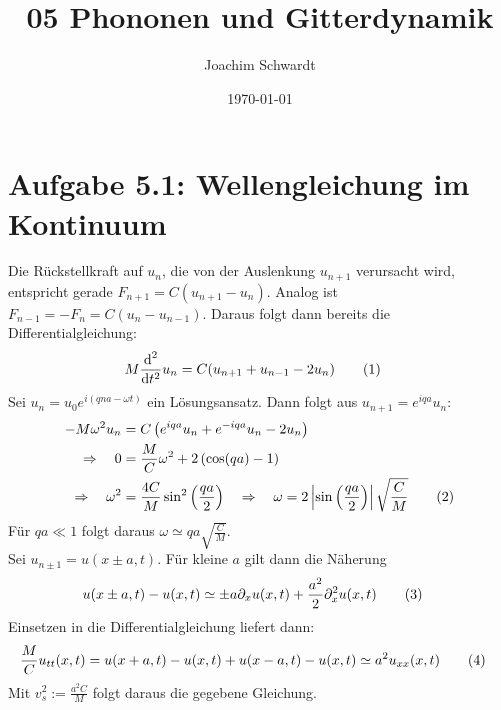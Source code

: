 \documentclass[a4paper,12pt]{article}
\newcommand\numberthis{\addtocounter{equation}{1}\tag{\theequation}}
\newcommand{\kla}{}
\newcommand{\tecxt}{}
\begin{document}
\title{05 Phononen und Gitterdynamik}
\author{Joachim Schwardt}
\date{\today}
\maketitle

\section*{Aufgabe 5.1: Wellengleichung im Kontinuum}
Die Rückstellkraft auf $u_n$, die von der Auslenkung $u_{n+1}$ verursacht wird, entspricht gerade $F_{n+1}=C(u_{n+1}-u_n)$. Analog ist $F_{n-1}=-F_n=C(u_n-u_{n-1})$. Daraus folgt dann bereits die Differentialgleichung:
\begin{align*}
M\frac{\tecxt\text{d}^2}{\tecxt\text{d}t^2}u_n&=C(u_{n+1}+u_{n-1}-2u_n)\numberthis\label{eqn:DGL diskrete}
\end{align*}
Sei $u_n=u_0e^{i(qna-\omega t)}$ ein Lösungsansatz. Dann folgt aus $u_{n+1}=e^{iqa}u_n$:
\begin{align*}
-M\omega^2u_n&=C\kla\left( {e^{iqa}u_n+e^{-iqa}u_n-2u_n} \right)\\
\Rightarrow\ \ \ 0&=\frac{M}{C}\omega^2+2\kla\left( {\cos(qa)-1} \right)\\
\Rightarrow\ \ \ \omega^2&=\frac{4C}{M}\sin^2\kla\left( {\frac{qa}{2}} \right)\ \ \ \Rightarrow\ \ \ \omega =2\left\vert\sin\kla\left( {\frac{qa}{2}} \right)\right\vert\sqrt{\frac{C}{M}}\numberthis\label{eqn:Dispersion omega von sin qa}
\end{align*}
Für $qa\ll 1$ folgt daraus $\omega\simeq qa\sqrt{\frac{C}{M}}$.\\
Sei $u_{n\pm 1}=u(x\pm a,t)$. Für kleine $a$ gilt dann die Näherung
\begin{align*}
u(x\pm a,t)-u(x,t)&\simeq \pm a\partial_xu(x,t)+\frac{a^2}{2}\partial_x^2u(x,t)\numberthis\label{eqn:approx u von x pm a}
\end{align*} 
Einsetzen in die Differentialgleichung liefert dann:
\begin{align*}
\frac{M}{C}u_{tt}(x,t)&=u(x+a,t)-u(x,t)+u(x-a,t)-u(x,t)\simeq a^2u_{xx}(x,t)\numberthis\label{eqn:DGL continuous}
\end{align*}
Mit $v_s^2:=\frac{a^2C}{M}$ folgt daraus die gegebene Gleichung.\newpage
\end{document}
